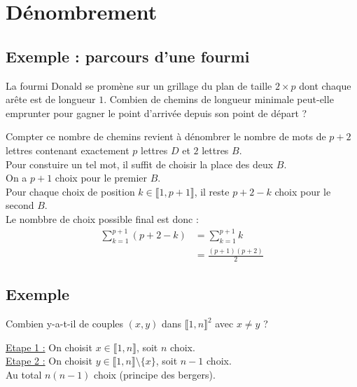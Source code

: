 \documentclass[../main.tex]{subfiles}
\begin{document}
\setcounter{chapter}{30}
\chapter{Dénombrement}
\tableofcontents
\clearpage

\section{Exemple : parcours d'une fourmi}
\begin{tcolorbox}[title=Exemple 31.12, title filled=false, colframe=darkgreen, colback=darkgreen!10!white]
    La fourmi Donald se promène sur un grillage du plan de taille $2\times p$ dont chaque arête est de longueur $1$. Combien de chemins de longueur minimale peut-elle emprunter pour gagner le point d'arrivée depuis son point de départ ?
\end{tcolorbox}

\noindent Compter ce nombre de chemins revient à dénombrer le nombre de mots de $p+2$ lettres contenant exactement $p$ lettres $D$ et $2$ lettres $B$. \\
Pour constuire un tel mot, il suffit de choisir la place des deux $B$. \\
On a $p+1$ choix pour le premier $B$. \\
Pour chaque choix de position $k\in \llbracket 1, p+1\rrbracket$, il reste $p+2-k$ choix pour le second $B$. \\
Le nombbre de choix possible final est donc : 
\begin{align*}
    \sum_{k=1}^{p+1} (p+2-k) &= \sum_{k=1}^{p+1} k \\
    &= \frac{(p+1)(p+2)}{2} 
\end{align*}

\section{Exemple}
\begin{tcolorbox}[title=Exemple 31.19, title filled=false, colframe=darkgreen, colback=darkgreen!10!white]
    Combien y-a-t-il de couples $(x, y)$ dans $\llbracket 1, n \rrbracket^2$ avec $x\neq y$ ?
\end{tcolorbox}
\noindent\underline{Etape 1 :} On choisit $x\in \llbracket 1, n \rrbracket$, soit $n$ choix. \\
\noindent\underline{Etape 2 :} On choisit $y\in \llbracket 1, n \rrbracket\setminus\{x\}$, soit $n-1$ choix. \\
Au total $n(n-1)$ choix (principe des bergers). 
\end{document}
